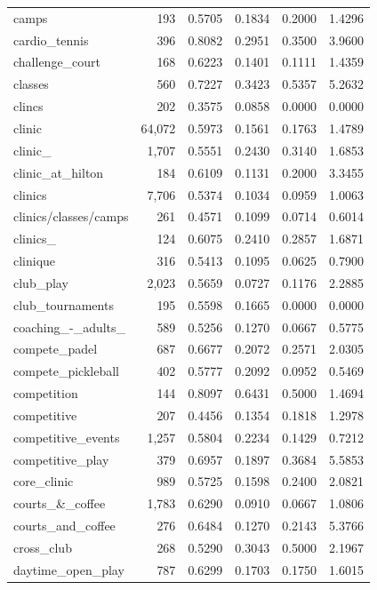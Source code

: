 \begin{table}[htbp]
\begin{tabular}{lrrrrr}
  camps & 193 & 0.5705 & 0.1834 & 0.2000 & 1.4296 \\
  cardio\_tennis & 396 & 0.8082 & 0.2951 & 0.3500 & 3.9600 \\
  challenge\_court & 168 & 0.6223 & 0.1401 & 0.1111 & 1.4359 \\
  classes & 560 & 0.7227 & 0.3423 & 0.5357 & 5.2632 \\
  clincs & 202 & 0.3575 & 0.0858 & 0.0000 & 0.0000 \\
  clinic & 64,072 & 0.5973 & 0.1561 & 0.1763 & 1.4789 \\
  clinic\_ & 1,707 & 0.5551 & 0.2430 & 0.3140 & 1.6853 \\
  clinic\_at\_hilton & 184 & 0.6109 & 0.1131 & 0.2000 & 3.3455 \\
  clinics & 7,706 & 0.5374 & 0.1034 & 0.0959 & 1.0063 \\
  clinics/classes/camps & 261 & 0.4571 & 0.1099 & 0.0714 & 0.6014 \\
  clinics\_ & 124 & 0.6075 & 0.2410 & 0.2857 & 1.6871 \\
  clinique & 316 & 0.5413 & 0.1095 & 0.0625 & 0.7900 \\
  club\_play & 2,023 & 0.5659 & 0.0727 & 0.1176 & 2.2885 \\
  club\_tournaments & 195 & 0.5598 & 0.1665 & 0.0000 & 0.0000 \\
  coaching\_-\_adults\_ & 589 & 0.5256 & 0.1270 & 0.0667 & 0.5775 \\
  compete\_padel & 687 & 0.6677 & 0.2072 & 0.2571 & 2.0305 \\
  compete\_pickleball & 402 & 0.5777 & 0.2092 & 0.0952 & 0.5469 \\
  competition & 144 & 0.8097 & 0.6431 & 0.5000 & 1.4694 \\
  competitive & 207 & 0.4456 & 0.1354 & 0.1818 & 1.2978 \\
  competitive\_events & 1,257 & 0.5804 & 0.2234 & 0.1429 & 0.7212 \\
  competitive\_play & 379 & 0.6957 & 0.1897 & 0.3684 & 5.5853 \\
  core\_clinic & 989 & 0.5725 & 0.1598 & 0.2400 & 2.0821 \\
  courts\_\&\_coffee & 1,783 & 0.6290 & 0.0910 & 0.0667 & 1.0806 \\
  courts\_and\_coffee & 276 & 0.6484 & 0.1270 & 0.2143 & 5.3766 \\
  cross\_club & 268 & 0.5290 & 0.3043 & 0.5000 & 2.1967 \\
  daytime\_open\_play & 787 & 0.6299 & 0.1703 & 0.1750 & 1.6015 \\

\end{tabular}
\end{table}
